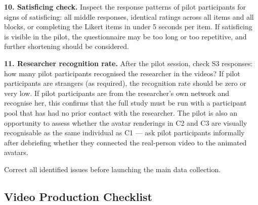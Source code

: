 \documentclass[11pt, a4paper]{article}
\begin{document}
\textbf{10. Satisficing check.}
Inspect the response patterns of pilot participants for signs of satisficing: all middle responses, identical ratings across all items and all blocks, or completing the Likert items in under 5 seconds per item. If satisficing is visible in the pilot, the questionnaire may be too long or too repetitive, and further shortening should be considered.

\textbf{11. Researcher recognition rate.}
After the pilot session, check S3 responses: how many pilot participants recognised the researcher in the videos? If pilot participants are strangers (as required), the recognition rate should be zero or very low. If pilot participants are from the researcher's own network and recognise her, this confirms that the full study must be run with a participant pool that has had no prior contact with the researcher. The pilot is also an opportunity to assess whether the avatar renderings in C2 and C3 are visually recognisable as the same individual as C1 --- ask pilot participants informally after debriefing whether they connected the real-person video to the animated avatars.

Correct all identified issues before launching the main data collection.

\subsection{Video Production Checklist}
\end{document}
